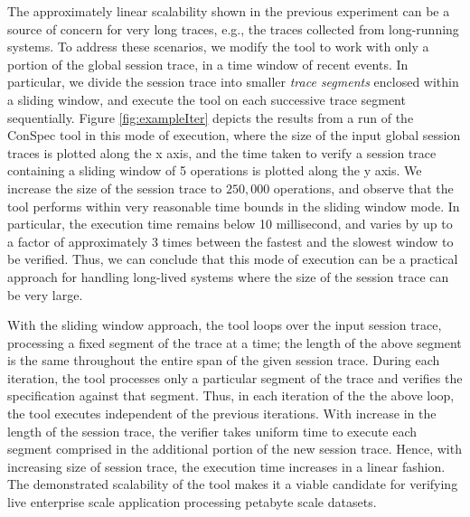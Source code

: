 \documentclass[journal, compsoc]{IEEEtran}
\begin{document}
	 \par The approximately linear scalability shown in the previous experiment can be a source of concern for very long traces, e.g., the traces collected from long-running systems. To address these scenarios, we modify the tool to work with only a portion of the global session trace, in a time window of recent events. In particular, we divide the session trace into smaller \emph{trace segments} enclosed within a sliding window, and execute  the tool on  each successive trace segment sequentially.   Figure \ref{fig:exampleIter} depicts the results from a run of the ConSpec tool in this mode of execution, where the size of the input global session traces is plotted along the x axis, and the time taken to verify a session trace containing a sliding window of 5 operations is plotted along the y axis. We increase the size of the session trace to $250,000$ operations, and observe that the tool performs within very reasonable time bounds in the sliding window mode. In particular, the execution time remains below %
	   10 millisecond, and varies by up to a factor of approximately 3 times between the fastest and the slowest window to be verified.   Thus, we can conclude that this mode of execution can be a practical approach for handling long-lived systems where the size of the session trace can be very large.
	  \par With the sliding window approach, the tool loops over the input session trace, processing a fixed segment of the trace at a time; the length of the above segment is the same throughout the entire span of the given session trace. During each iteration, the tool processes only a particular segment of the trace and verifies the specification against that segment. Thus, in each iteration of the the above loop, the tool executes  independent of the previous iterations. With increase in the length of the session trace, the verifier takes uniform time to execute each segment comprised in the additional portion of the new session trace. Hence, with increasing size of session trace, the execution time increases in a linear fashion. The demonstrated scalability of the tool makes it a  viable candidate for verifying live enterprise scale application processing petabyte scale datasets.
\end{document}

